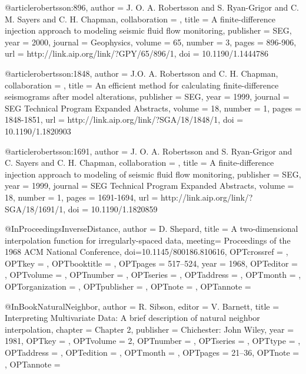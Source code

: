 {@article{robertsson:896,
author = {J. O. A. Robertsson and S. Ryan-Grigor and C. M. Sayers and C. H. Chapman},
collaboration = {},
title = {A finite-difference injection approach to modeling seismic fluid flow monitoring},
publisher = {SEG},
year = {2000},
journal = {Geophysics},
volume = {65},
number = {3},
pages = {896-906},
url = {http://link.aip.org/link/?GPY/65/896/1},
doi = {10.1190/1.1444786}
}







@article{robertsson:1848,
author = {J.O. A. Robertsson and C. H. Chapman},
collaboration = {},
title = {An efficient method for calculating finite-difference seismograms after model alterations},
publisher = {SEG},
year = {1999},
journal = {SEG Technical Program Expanded Abstracts},
volume = {18},
number = {1},
pages = {1848-1851},
url = {http://link.aip.org/link/?SGA/18/1848/1},
doi = {10.1190/1.1820903}
}







@article{robertsson:1691,
author = {J. O. A. Robertsson and S.  Ryan-Grigor and C. Sayers and C. H. Chapman},
collaboration = {},
title = {A finite-difference injection approach to modeling of seismic fluid flow monitoring},
publisher = {SEG},
year = {1999},
journal = {SEG Technical Program Expanded Abstracts},
volume = {18},
number = {1},
pages = {1691-1694},
url = {http://link.aip.org/link/?SGA/18/1691/1},
doi = {10.1190/1.1820859}
}


@InProceedings{InverseDistance,
  author = 	 {D. Shepard},
  title = 	 {A two-dimensional interpolation function for
                  irregularly-spaced data},
  meeting= {Proceedings of the 1968 ACM National Conference},
  doi={10.1145/800186.810616},
  OPTcrossref =  {},
  OPTkey = 	 {},
  OPTbooktitle = {},
  OPTpages = 	 {517–524},
  year = 	 {1968},
  OPTeditor = 	 {},
  OPTvolume = 	 {},
  OPTnumber = 	 {},
  OPTseries = 	 {},
  OPTaddress = 	 {},
  OPTmonth = 	 {},
  OPTorganization = {},
  OPTpublisher = {},
  OPTnote = 	 {},
  OPTannote = 	 {}
}

@InBook{NaturalNeighbor,
  author = 	 {R. Sibson},
  editor = 	 {V. Barnett},
  title = 	 {Interpreting Multivariate Data: A brief description of natural neighbor interpolation},
  chapter = 	 {Chapter 2},
  publisher = 	 {Chichester: John Wiley},
  year = 	 {1981},
  OPTkey = 	 {},
  OPTvolume = 	 {2},
  OPTnumber = 	 {},
  OPTseries = 	 {},
  OPTtype = 	 {},
  OPTaddress = 	 {},
  OPTedition = 	 {},
  OPTmonth = 	 {},
  OPTpages = 	 {21–36},
  OPTnote = 	 {},
  OPTannote = 	 {}
}

}
